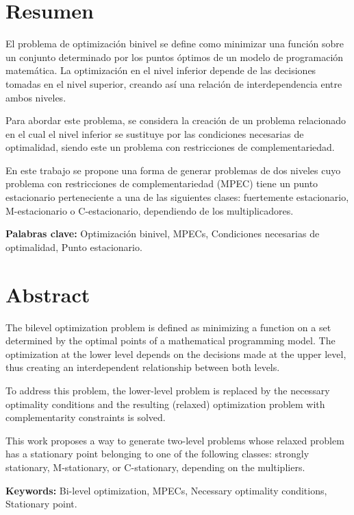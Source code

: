 \chapter*{Resumen}

El problema de optimización binivel se define como minimizar una función sobre un conjunto determinado por los puntos óptimos de un modelo de programación matemática. La optimización en el nivel inferior depende de las decisiones tomadas en el nivel superior, creando así una relación de interdependencia entre ambos niveles.

Para abordar este problema, se considera la creación de un problema relacionado en el cual el nivel inferior se sustituye por las condiciones necesarias de optimalidad, siendo este un problema con restricciones de complementariedad.

En este trabajo se propone una forma de generar problemas de dos niveles cuyo problema con restricciones de complementariedad (MPEC) tiene un punto estacionario perteneciente a una de las siguientes 
clases: fuertemente estacionario, M-estacionario o C-estacionario, dependiendo de los multiplicadores.


\textbf{Palabras clave:} Optimización binivel, MPECs, Condiciones necesarias de optimalidad, Punto estacionario.

\chapter*{Abstract}
The bilevel optimization problem is defined as minimizing a function on a set determined by the optimal points of a mathematical programming model. The optimization at the lower level depends on the decisions made at the upper level, thus creating an interdependent relationship between both levels.

To address this problem, the lower-level problem is replaced by the necessary optimality conditions and the resulting (relaxed) optimization problem with complementarity constraints is solved.

This work proposes a way to generate two-level problems whose relaxed problem has a stationary point belonging to one of the following classes: strongly stationary, M-stationary, or C-stationary, depending on the multipliers.

\textbf{Keywords:} Bi-level optimization, MPECs, Necessary optimality conditions, Stationary point.
